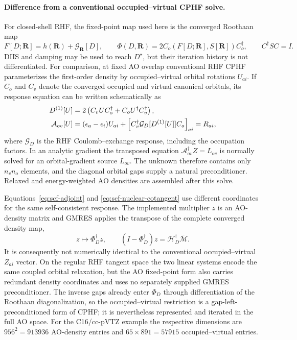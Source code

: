\documentclass[11pt]{article}
\begin{document}
\paragraph{Difference from a conventional occupied--virtual CPHF solve.}
For closed-shell RHF, the fixed-point map used here is the converged
Roothaan map
\begin{equation}
 F[D;\mathbf R]=h(\mathbf R)+\mathcal G_{\mathbf R}[D],
 \qquad
 \Phi(D,\mathbf R)=2C_o(F[D;\mathbf R],S[\mathbf R])C_o^\dagger,
 \qquad C^\dagger SC=I.
 \label{eq:rhf-roothaan-map}
\end{equation}
DIIS and damping may be used to reach $D^\star$, but their iteration history
is not differentiated.  For comparison, at fixed AO overlap conventional
RHF CPHF parameterizes the first-order density by occupied--virtual orbital
rotations $U_{ai}$.  If $C_o$ and $C_v$ denote the converged occupied and
virtual canonical orbitals, its response equation can be written
schematically as
\begin{align}
 D^{(1)}[U]
 &=2\left(C_vUC_o^\dagger+C_oU^\dagger C_v^\dagger\right),\notag\\
 \mathcal A_{ov}[U]
 &=(\epsilon_a-\epsilon_i)U_{ai}
   +\left[C_v^\dagger\mathcal G_D[D^{(1)}[U]]C_o\right]_{ai}
   =R_{ai},
 \label{eq:conventional-ov-cphf}
\end{align}
where $\mathcal G_D$ is the RHF Coulomb--exchange response, including the
occupation factors.  In an analytic gradient the transposed equation
$\mathcal A_{ov}^\dagger Z=L_{ov}$ is normally solved for an orbital-gradient
source $L_{ov}$.  The unknown therefore contains only $n_vn_o$ elements,
and the diagonal orbital gaps supply a natural preconditioner.  Relaxed and
energy-weighted AO densities are assembled after this solve.

Equations~\eqref{eq:scf-adjoint} and
\eqref{eq:scf-nuclear-cotangent} use different coordinates for the same
self-consistent response.  The implemented multiplier $z$ is an AO-density
matrix and GMRES applies the transpose of the complete converged density map,
\begin{equation}
 z\longmapsto\Phi_D^\dagger z,
 \qquad
 (I-\Phi_D^\dagger)z=\mathcal H_D^\dagger
                         \overline{\mathcal M}.
 \label{eq:ao-density-scf-adjoint}
\end{equation}
It is consequently not numerically identical to the conventional
occupied--virtual $Z_{ai}$ vector.  On the regular RHF tangent space the two
linear systems encode the same coupled orbital relaxation, but the AO
fixed-point form also carries redundant density coordinates and uses no
separately supplied GMRES preconditioner.  The inverse gaps already enter
$\Phi_D$ through differentiation of the Roothaan diagonalization, so the
occupied--virtual restriction is a gap-left-preconditioned form of CPHF;
it is nevertheless represented and iterated in the full AO space.  For the
C16/cc-pVTZ example the respective dimensions are $956^2=913936$ AO-density
entries and $65\times891=57915$ occupied--virtual entries.
\end{document}
